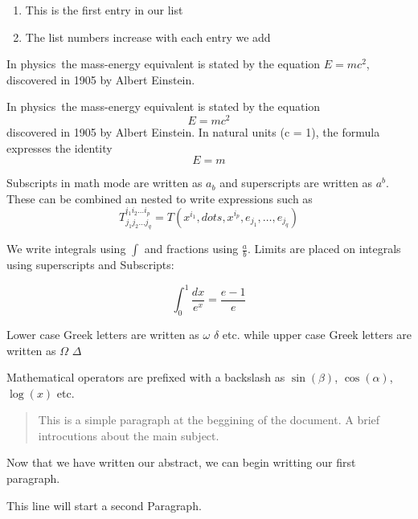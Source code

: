 \documentclass[12pt, letterpaper]{report}
\begin{document}
    \bigbreak

    \begin{enumerate}
        \item This is the first entry in our list
        \item The list numbers increase with each entry we add
    \end{enumerate}


    \pagebreak

    In physics\ the mass-energy equivalent is stated
    by the equation $E=mc^2$, discovered in 1905 by Albert Einstein.

    \bigbreak

    In physics\ the mass-energy equivalent is stated
    by the equation 
    \[E=mc^2\]
    discovered in 1905 by Albert Einstein. In natural units (c = 1), the formula expresses the identity 
    \begin{equation}
        E=m
    \end{equation}

    \pagebreak

    Subscripts in math mode are written as $a_b$ and superscripts are written as $a^b$.
    These can be combined an nested to write expressions such as 
    \[ T^{i_1 i_2 \dots i_p}_{j_1 j_2 \dots j_q} = T(x^{i_1}, dots, x^{i_p}, e_{j_1}, \dots, e_{j_q}) \]

    We write integrals using $\int$ and fractions using $\frac{a}{b}$. Limits are placed on integrals using superscripts and Subscripts:

    \[ \int_0^1 \frac{dx}{e^x} = \frac{e-1}{e} \]

    Lower case Greek letters are written as $\omega$ $\delta$ etc. 
    while upper case Greek letters are written as $\Omega$ $\Delta$
    
    Mathematical operators are prefixed with a backslash as 
    $\sin(\beta)$,
    $\cos(\alpha)$,
    $\log(x)$
    etc.


    \pagebreak

    \begin{abstract}
            This is a simple paragraph at the beggining of the document. A brief introcutions about the main subject.

    \end{abstract}

    Now that we have written our abstract, we can begin writting our first paragraph.
    

    This line will start a second Paragraph.
\end{document}
